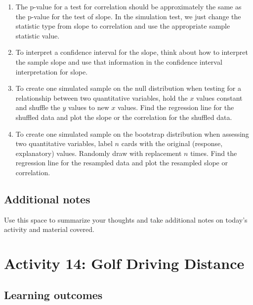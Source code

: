 \documentclass[
]{report}
\begin{document}
\begin{enumerate}
\def\labelenumi{\arabic{enumi}.}
\item
  The p-value for a test for correlation should be approximately the same as the p-value for the test of slope. In the simulation test, we just change the statistic type from slope to correlation and use the appropriate sample statistic value.
\item
  To interpret a confidence interval for the slope, think about how to interpret the sample slope and use that information in the confidence interval interpretation for slope.
\item
  To create one simulated sample on the null distribution when testing for a relationship between two quantitative variables, hold the \(x\) values constant and shuffle the \(y\) values to new \(x\) values. Find the regression line for the shuffled data and plot the slope or the correlation for the shuffled data.
\item
  To create one simulated sample on the bootstrap distribution when assessing two quantitative variables, label \(n\) cards with the original (response, explanatory) values. Randomly draw with replacement \(n\) times. Find the regression line for the resampled data and plot the resampled slope or correlation.
\end{enumerate}

\hypertarget{additional-notes-22}{%
\subsection{Additional notes}\label{additional-notes-22}}

Use this space to summarize your thoughts and take additional notes on today's activity and material covered.

\newpage

\hypertarget{activity-14-golf-driving-distance}{%
\section{Activity 14: Golf Driving Distance}\label{activity-14-golf-driving-distance}}


\hypertarget{learning-outcomes-29}{%
\subsection{Learning outcomes}\label{learning-outcomes-29}}
\end{document}

